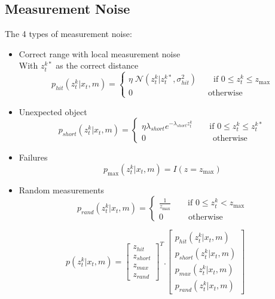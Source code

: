 
\subsection{Measurement Noise}
The 4 types of measurement noise:
\begin{itemize}
	\item Correct range with local measurement noise\\
	With $z_t^{k*}$ as the correct distance
	\begin{equation}
		p_{hit}(z_t^k | x_t, m) = \begin{cases}
			\eta\; \mathcal{N}(z_t^k| z_t^{k*}, \sigma^2_{hit}) \qquad \text{if } 0 \leq z_t^k \leq z_{\max}\\
			0 \qquad\qquad\qquad\qquad\quad \text{otherwise}
		\end{cases}
	\end{equation}
	\item Unexpected object
	\begin{equation}
		p_{short}(z_t^k | x_t, m) = \begin{cases}
			\eta\lambda_{short} e^{-\lambda_{short} z_t^k} \qquad \text{if } 0 \leq z_t^k \leq z_t^{k*}\\
			0 \qquad\qquad\qquad\qquad \text{otherwise}
		\end{cases}
	\end{equation}
	\item Failures
	\begin{equation}
		p_{\max}(z_t^k | x_t, m) = I(z=z_{\max})
	\end{equation}
	\item Random measurements
	\begin{equation}
		p_{rand}(z_t^k | x_t, m) = \begin{cases}
			\frac{1}{z_{\max}} \qquad \text{if } 0 \leq z_t^k < z_{\max}\\
			0 \qquad\quad \text{otherwise}
		\end{cases}
	\end{equation}
\end{itemize}


\begin{equation}
	p(z_t^k | x_t, m) = \begin{bmatrix}
		z_{hit}\\ z_{short}\\
		z_{max}\\ z_{rand}
	\end{bmatrix}^T . \begin{bmatrix}
		p_{hit}(z_t^k | x_t, m)\\ p_{short}(z_t^k | x_t, m)\\
		p_{max}(z_t^k | x_t, m)\\ p_{rand}(z_t^k | x_t, m)
	\end{bmatrix}
\end{equation}

